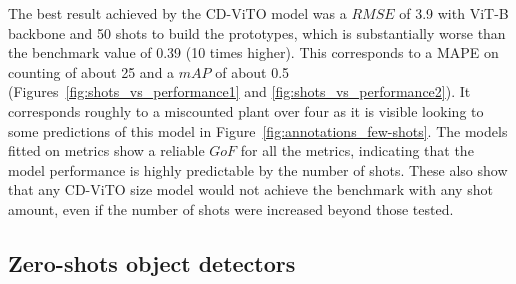 \documentclass[12pt,a4paper,oneside]{report}
\begin{document}
The best result achieved by the CD-ViTO model was a $RMSE$ of 3.9 with ViT-B backbone and 
50 shots to build the prototypes, which is substantially worse than the benchmark value of 0.39 (10 times higher). 
This corresponds to a MAPE on counting of about 25%
and a $mAP$ of about 0.5 (Figures~\ref{fig:shots_vs_performance1} and \ref{fig:shots_vs_performance2}).
It corresponds roughly to a miscounted plant over four as it is visible looking to
some predictions of this model in Figure~\ref{fig:annotations_few-shots}.
The models fitted on metrics show a reliable $GoF$ for all
the metrics, indicating that the model performance is highly predictable by the number of shots.
These also show that any CD-ViTO size model would not achieve the
benchmark with any shot amount, even if the number of shots were increased beyond those tested.


\subsection{Zero-shots object detectors}
\end{document}
